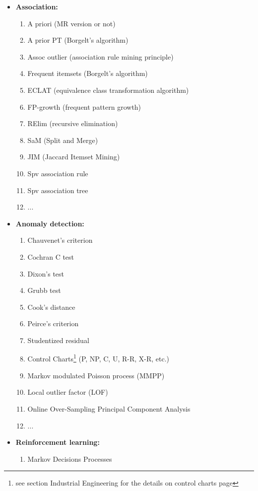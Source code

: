 \begin{itemize}
\begin{enumerate}
			\item ...
		\end{enumerate}
		\item \textbf{Association:}
		\begin{enumerate}
			\item A priori (MR version or not)
			\item A prior PT (Borgelt's algorithm)
			\item Assoc outlier (association rule mining principle)
			\item Frequent itemsets (Borgelt's algorithm)
			\item ECLAT (equivalence class transformation algorithm)
			\item FP-growth (frequent pattern growth)
			\item RElim (recursive elimination)
			\item SaM (Split and Merge)
			\item JIM (Jaccard Itemset Mining)
			\item Spv association rule 
			\item Spv association tree
			\item ...
		\end{enumerate}
		\item \textbf{Anomaly detection:}
		\begin{enumerate}
			\item Chauvenet's criterion
			\item Cochran C test
			\item Dixon's test
			\item Grubb test
			\item Cook's distance
			\item Peirce's criterion
			\item Studentized residual
			\item Control Charts\footnote{see section Industrial Engineering for the details on control charts page \pageref{quality control charts}} (P, NP, C, U, R-R, X-R, etc.)
			\item Markov modulated Poisson process
(MMPP)
			\item Local outlier factor (LOF)
			\item Online Over-Sampling Principal Component Analysis
			\item ...
		\end{enumerate}
		\item \textbf{Reinforcement learning:}
		\begin{enumerate}
			\item Markov Decisions Processes

\end{enumerate}
\end{itemize}
